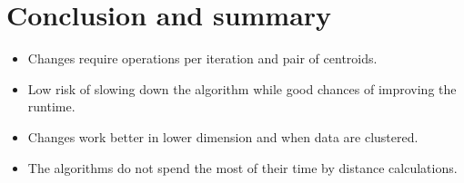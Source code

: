 \documentclass[10pt, compress]{beamer}
\newcommand{\plotwidth}{\textwidth}
\newcommand{\plotheight}{0.6\textwidth}
\newcommand{\strongplot}[1]{\color{gray}{#1}}
\newcommand{\x}{\vec{x}}
\newcommand{\ux}{u(\x)}
\begin{document}


\section{Conclusion and summary}

\begin{frame}
  \begin{itemize}
    \item Changes require operations per iteration and pair of centroids.
    \item Low risk of slowing down the algorithm while good chances of improving the runtime.
    \item Changes work better in lower dimension and when data are clustered.
    \item The algorithms do not spend the most of their time by distance calculations.
  \end{itemize}
\end{frame}
\end{document}
